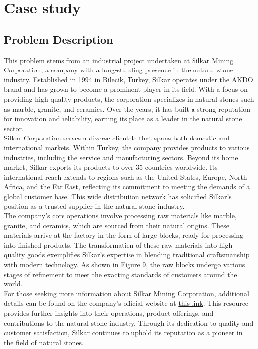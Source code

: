 \documentclass[a4paper]{article}
\begin{document}
    \pagebreak
    \section{Case study}
    \label{sec:case_study}
    \subsection{Problem Description}
    This problem stems from an industrial project undertaken at Silkar Mining Corporation, a company with a long-standing presence in the natural stone industry. Established in 1994 in Bilecik, Turkey, Silkar operates under the AKDO brand and has grown to become a prominent player in its field. With a focus on providing high-quality products, the corporation specializes in natural stones such as marble, granite, and ceramics. Over the years, it has built a strong reputation for innovation and reliability, earning its place as a leader in the natural stone sector.
    \vspace{0.2cm}\\
    Silkar Corporation serves a diverse clientele that spans both domestic and international markets. Within Turkey, the company provides products to various industries, including the service and manufacturing sectors. Beyond its home market, Silkar exports its products to over 35 countries worldwide. Its international reach extends to regions such as the United States, Europe, North Africa, and the Far East, reflecting its commitment to meeting the demands of a global customer base. This wide distribution network has solidified Silkar's position as a trusted supplier in the natural stone industry.
    \vspace{0.2cm}\\
    The company’s core operations involve processing raw materials like marble, granite, and ceramics, which are sourced from their natural origins. These materials arrive at the factory in the form of large blocks, ready for processing into finished products. The transformation of these raw materials into high-quality goods exemplifies Silkar’s expertise in blending traditional craftsmanship with modern technology. As shown in Figure 9, the raw blocks undergo various stages of refinement to meet the exacting standards of customers around the world.
    \vspace{0.2cm}\\
    For those seeking more information about Silkar Mining Corporation, additional details can be found on the company’s official website at \href{https://silkarstone.com/en/corporate}{this link}. This resource provides further insights into their operations, product offerings, and contributions to the natural stone industry. Through its dedication to quality and customer satisfaction, Silkar continues to uphold its reputation as a pioneer in the field of natural stones.
\end{document}

